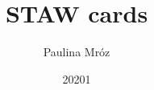 \documentclass[a4paper,8pt,twoside,openright]{report}
\author{Paulina Mr\'oz}
\title{STAW cards}
\date{20201}
\begin{document}
\pagestyle{empty}

\begin{center}

\end{center}
\end{document}
